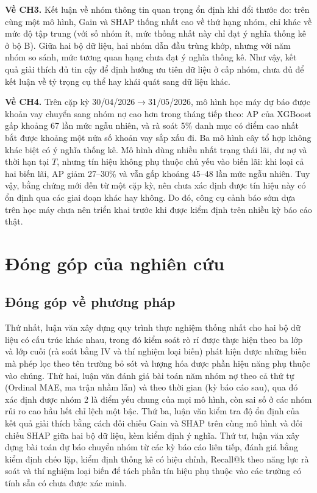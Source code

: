 \noindent\textbf{Về CH3.} Kết luận về nhóm thông tin quan trọng ổn định khi đổi thước đo: trên cùng một mô hình, Gain và SHAP thống nhất cao về thứ hạng nhóm, chỉ khác về mức độ tập trung (với số nhóm ít, mức thống nhất này chỉ đạt ý nghĩa thống kê ở bộ B). Giữa hai bộ dữ liệu, hai nhóm dẫn đầu trùng khớp, nhưng với năm nhóm so sánh, mức tương quan hạng chưa đạt ý nghĩa thống kê. Như vậy, kết quả giải thích đủ tin cậy để định hướng ưu tiên dữ liệu ở cấp nhóm, chưa đủ để kết luận về tỷ trọng cụ thể hay khái quát sang dữ liệu khác.

\noindent\textbf{Về CH4.} Trên cặp kỳ 30/04/2026$\to$31/05/2026, mô hình học máy dự báo được khoản vay chuyển sang nhóm nợ cao hơn trong tháng tiếp theo: AP của XGBoost gấp khoảng 67 lần mức ngẫu nhiên, và rà soát 5\% danh mục có điểm cao nhất bắt được khoảng một nửa số khoản vay sắp xấu đi. Ba mô hình cây tổ hợp không khác biệt có ý nghĩa thống kê. Mô hình dùng nhiều nhất trạng thái lãi, dư nợ và thời hạn tại $T$, nhưng tín hiệu không phụ thuộc chủ yếu vào biến lãi: khi loại cả hai biến lãi, AP giảm 27--30\% và vẫn gấp khoảng 45--48 lần mức ngẫu nhiên. Tuy vậy, bằng chứng mới đến từ một cặp kỳ, nên chưa xác định được tín hiệu này có ổn định qua các giai đoạn khác hay không. Do đó, công cụ cảnh báo sớm dựa trên học máy chưa nên triển khai trước khi được kiểm định trên nhiều kỳ báo cáo thật.

\section{Đóng góp của nghiên cứu}

\subsection{Đóng góp về phương pháp}

Thứ nhất, luận văn xây dựng quy trình thực nghiệm thống nhất cho hai bộ dữ liệu có cấu trúc khác nhau, trong đó kiểm soát rò rỉ được thực hiện theo ba lớp và lớp cuối (rà soát bằng IV và thí nghiệm loại biến) phát hiện được những biến mà phép lọc theo tên trường bỏ sót và lượng hóa được phần hiệu năng phụ thuộc vào chúng. Thứ hai, luận văn đánh giá bài toán năm nhóm nợ theo cả thứ tự (Ordinal MAE, ma trận nhầm lẫn) và theo thời gian (kỳ báo cáo sau), qua đó xác định được nhóm 2 là điểm yếu chung của mọi mô hình, còn sai số ở các nhóm rủi ro cao hầu hết chỉ lệch một bậc. Thứ ba, luận văn kiểm tra độ ổn định của kết quả giải thích bằng cách đối chiếu Gain và SHAP trên cùng mô hình và đối chiếu SHAP giữa hai bộ dữ liệu, kèm kiểm định ý nghĩa. Thứ tư, luận văn xây dựng bài toán dự báo chuyển nhóm từ các kỳ báo cáo liên tiếp, đánh giá bằng kiểm định chéo lặp, kiểm định thống kê có hiệu chỉnh, Recall@k theo năng lực rà soát và thí nghiệm loại biến để tách phần tín hiệu phụ thuộc vào các trường có tính sẵn có chưa được xác minh.

